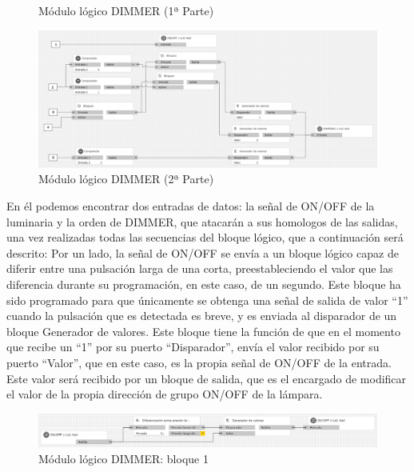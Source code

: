 \begin{itemize}
\begin{center}
\begin{figure}[H]
\caption{Módulo lógico DIMMER (1ª Parte)}
\label{fig:log_dimm_izq}
\end{figure}
\end{center}
 \begin{center}
\begin{figure}[H]
\includegraphics[width=1.05\textwidth]{figures/log_dimm_der.png}   
\caption{Módulo lógico DIMMER (2ª Parte)}
\label{fig:log_dimm_der}
\end{figure}
\end{center}
En él podemos encontrar dos entradas de datos: la señal de ON/OFF de la luminaria y la orden de DIMMER, que atacarán a sus homologos de las salidas, una vez realizadas todas las secuencias del bloque lógico, que a continuación será descrito: 
\newpage
Por un lado, la señal de ON/OFF se envía a un bloque lógico capaz de diferir entre una pulsación larga de una corta, preestableciendo el valor que las diferencia durante su programación, en este caso, de un segundo. Este bloque ha sido programado para que únicamente se obtenga una señal de salida de valor “1” cuando la pulsación que es detectada es breve, y es enviada al disparador de un bloque Generador de valores. Este bloque tiene la función de que en el momento que recibe un “1” por su puerto “Disparador”, envía el valor recibido por su puerto “Valor”, que en este caso, es la propia señal de ON/OFF de la entrada. Este valor será recibido por un bloque de salida, que es el encargado de modificar el valor de la propia dirección de grupo ON/OFF de la lámpara.
\begin{center}
\begin{figure}[H]
\includegraphics[width=1.15\textwidth]{figures/log_dimm_b1.png}   
\caption{Módulo lógico DIMMER: bloque 1}
\label{fig:log_dimm_b1}
\end{figure}
\end{center}

\end{itemize}
